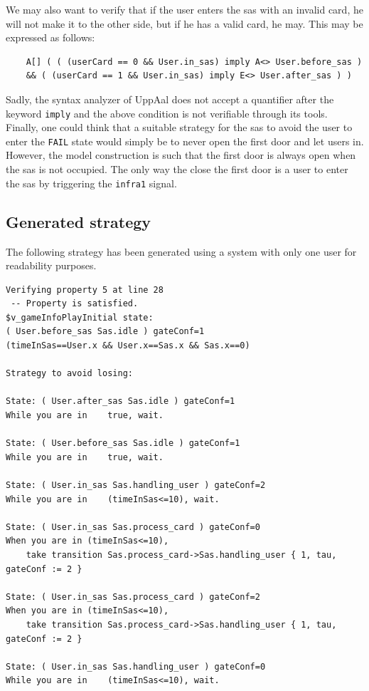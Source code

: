 We may also want to verify that if the user enters the sas with an invalid card, he will not make it to the other side, but if he has a valid card, he may.
This may be expressed as follows:
\begin{small}
\begin{verbatim}
	A[] ( ( (userCard == 0 && User.in_sas) imply A<> User.before_sas ) 
	&& ( (userCard == 1 && User.in_sas) imply E<> User.after_sas ) )
\end{verbatim}
\end{small}

Sadly, the syntax analyzer of UppAal does not accept a quantifier after the keyword \texttt{imply} and the above condition is not verifiable through its tools.\\

Finally, one could think that a suitable strategy for the sas to avoid the user to enter the \texttt{FAIL} state would simply be to never open the first door and let users in.
However, the model construction is such that the first door is always open when the sas is not occupied.
The only way the close the first door is a user to enter the sas by triggering the \texttt{infra1} signal.

\subsection{Generated strategy}
The following strategy has been generated using a system with only one user for readability purposes.

\begin{verbatim}
Verifying property 5 at line 28
 -- Property is satisfied.
$v_gameInfoPlayInitial state:
( User.before_sas Sas.idle ) gateConf=1 
(timeInSas==User.x && User.x==Sas.x && Sas.x==0)

Strategy to avoid losing:

State: ( User.after_sas Sas.idle ) gateConf=1 
While you are in	true, wait.

State: ( User.before_sas Sas.idle ) gateConf=1 
While you are in	true, wait.

State: ( User.in_sas Sas.handling_user ) gateConf=2 
While you are in	(timeInSas<=10), wait.

State: ( User.in_sas Sas.process_card ) gateConf=0 
When you are in (timeInSas<=10), 
	take transition Sas.process_card->Sas.handling_user { 1, tau, gateConf := 2 }

State: ( User.in_sas Sas.process_card ) gateConf=2 
When you are in (timeInSas<=10), 
	take transition Sas.process_card->Sas.handling_user { 1, tau, gateConf := 2 }

State: ( User.in_sas Sas.handling_user ) gateConf=0 
While you are in	(timeInSas<=10), wait.
\end{verbatim}

